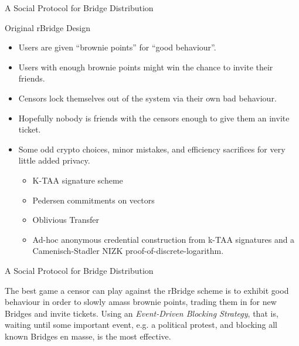\documentclass[9pt,a4paper,handout]{beamer}
\begin{document}
\begin{frame}{A Social Protocol for Bridge Distribution}
  \begin{block}{Original rBridge Design}
    \begin{itemize}
      \item<2-> Users are given ``brownie points'' for ``good behaviour''.
      \item<3-> Users with enough brownie points might win the chance to invite their friends.
      \item<4-> Censors lock themselves out of the system via their own bad behaviour.
      \item<5-> Hopefully nobody is friends with the censors enough to give them an invite ticket.
      \item<6-> Some odd crypto choices, minor mistakes, and efficiency sacrifices for very little
        added privacy.
        \begin{itemize}
          \item<7-> K-TAA signature scheme
          \item<8-> Pedersen commitments on vectors
          \item<9-> Oblivious Transfer
          \item<10-> Ad-hoc anonymous credential construction from k-TAA signatures and
            a Camenisch-Stadler NIZK proof-of-discrete-logarithm.
        \end{itemize}
    \end{itemize}
  \end{block}

\end{frame}


\begin{frame}{A Social Protocol for Bridge Distribution}

  The best game a censor can play against the rBridge scheme is to exhibit good behaviour in order
  to slowly amass brownie points, trading them in for new Bridges and invite tickets. Using an
  \emph{Event-Driven Blocking Strategy}, that is, waiting until some important event, e.g. a
  political protest, and blocking all known Bridges en masse, is the most effective.


\end{frame}
\end{document}
